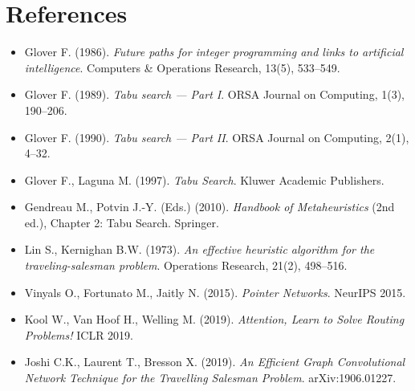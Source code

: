 \documentclass[12pt,a4paper]{article}
\begin{document}
\section*{References}

\begin{itemize}[leftmargin=1.5em]
  \item Glover F. (1986).
    \textit{Future paths for integer programming and links to artificial
    intelligence}.
    Computers \& Operations Research, 13(5), 533--549.
  \item Glover F. (1989).
    \textit{Tabu search --- Part I}.
    ORSA Journal on Computing, 1(3), 190--206.
  \item Glover F. (1990).
    \textit{Tabu search --- Part II}.
    ORSA Journal on Computing, 2(1), 4--32.
  \item Glover F., Laguna M. (1997).
    \textit{Tabu Search}.
    Kluwer Academic Publishers.
  \item Gendreau M., Potvin J.-Y. (Eds.) (2010).
    \textit{Handbook of Metaheuristics} (2nd ed.), Chapter 2: Tabu Search.
    Springer.
  \item Lin S., Kernighan B.W. (1973).
    \textit{An effective heuristic algorithm for the traveling-salesman
    problem}.
    Operations Research, 21(2), 498--516.
  \item Vinyals O., Fortunato M., Jaitly N. (2015).
    \textit{Pointer Networks}.
    NeurIPS 2015.
  \item Kool W., Van Hoof H., Welling M. (2019).
    \textit{Attention, Learn to Solve Routing Problems!}
    ICLR 2019.
  \item Joshi C.K., Laurent T., Bresson X. (2019).
    \textit{An Efficient Graph Convolutional Network Technique for the
    Travelling Salesman Problem}.
    arXiv:1906.01227.
\end{itemize}
\end{document}
